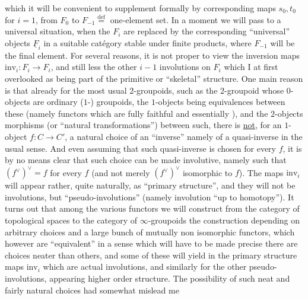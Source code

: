 which it will be convenient to supplement  formally by corresponding maps $s_0,t_0$ for $i=1$, from $F_0$ to $F_{-1}\mathrel{\overset{\mathrm{def}}{=}}$ one-element set. In a moment we will pass to a universal situation, when the $F_i$ are replaced by the corresponding ``universal'' objects $\underline{F}_i$ in a suitable catégory stable under finite products, where $F_{-1}$ will be the final element. For several reasons, it is not proper to view the inversion maps $\mathrm{inv}_i:F_i\to F_i$, and still less the other $i-1$ involutions on $F_i$ which I at first overlooked\handwritten{,} as being part of the primitive or ``skeletal'' structure. One main reason is that already for the most usual $2$-groupoids, such as the $2$-groupoid whose $0$-objects are ordinary ($1$-) groupoids, the $1$-objects being equivalences between these (namely functors which are fully faithful and essentially ), and the $2$-objects morphisms (or ``natural transformations'') between such, there is \uline{not}, for an $1$-object $f:C\to C'$, a natural choice of an ``inverse'' namely of a quasi-inverse in the usual sense. And even assuming that such quasi-inverse is chosen for every $f$, it is by no means clear that such choice can be made involutive, namely such that $(f^{\vee})^{\vee}=f$ for every $f$ (and not merely $(f^{\vee})^{\vee}$ isomorphic to $f$). The maps $\mathrm{inv}_i$ will appear rather, quite naturally, as ``primary structure'', and they will not be involutions, but ``pseudo-involutions'' (namely involution ``up to homotopy''). It turns out that among the various functors \inserted{\handwritten{$\Pi_\infty$}} we will construct\handwritten{,} from the category of topological spaces to the category of $\infty$-groupoids\deleted{\unsure{,}} \handwritten{(}the construction depending on arbitrary choices and  a large bunch of mutually non isomorphic functors, which however are ``equivalent'' in a sense which will have to be made precise\unsure{\ldots}\deleted{-}\handwritten{)} there are choices neater than others, and some of these will yield in the primary structure maps $\mathrm{inv}_i$ which are actual involutions, and similarly for the other pseudo-involutions, appearing  higher order structure. The possibility of such neat and fairly natural choices had somewhat mislead me
